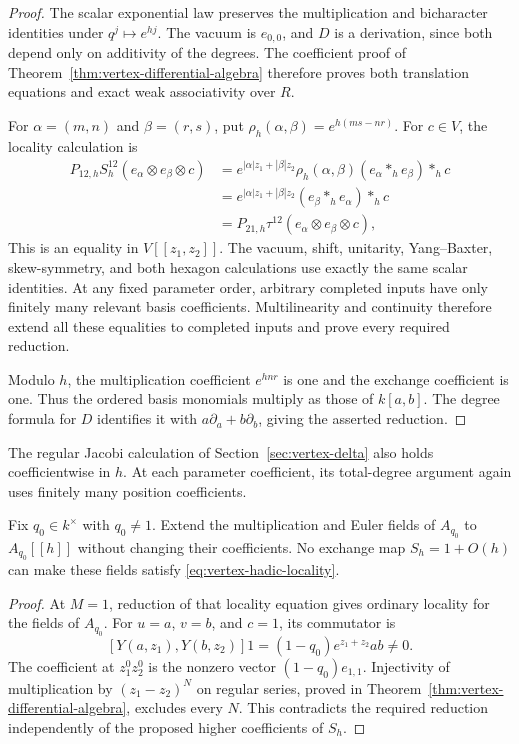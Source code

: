 \begin{proof}
The scalar exponential law preserves the multiplication and bicharacter
identities under $q^j\mapsto e^{hj}$.
The vacuum is $e_{0,0}$, and $D$ is a derivation,
since both depend only on additivity of the degrees.
The coefficient proof of
Theorem~\ref{thm:vertex-differential-algebra} therefore proves both
translation equations and exact weak associativity over $R$.

For $\alpha=(m,n)$ and $\beta=(r,s)$, put
$\rho_h(\alpha,\beta)=e^{h(ms-nr)}$.
For $c\in V$, the locality calculation is
\[
 \begin{aligned}
 P_{12,h}S_h^{12}(e_\alpha\otimes e_\beta\otimes c)
  &=e^{|\alpha|z_1+|\beta|z_2}
       \rho_h(\alpha,\beta)(e_\alpha*_h e_\beta)*_h c\\
  &=e^{|\alpha|z_1+|\beta|z_2}
       (e_\beta*_h e_\alpha)*_h c\\
  &=P_{21,h}\tau^{12}(e_\alpha\otimes e_\beta\otimes c),
 \end{aligned}
\]
This is an equality in $V[[z_1,z_2]]$.
The vacuum, shift, unitarity, Yang--Baxter, skew-symmetry, and both
hexagon calculations use exactly the same scalar identities.
At any fixed parameter order, arbitrary completed inputs have only
finitely many relevant basis coefficients.
Multilinearity and continuity therefore extend all these equalities
to completed inputs and prove every required reduction.

Modulo $h$, the multiplication coefficient $e^{hnr}$ is one and
the exchange coefficient is one.
Thus the ordered basis monomials multiply as those of $k[a,b]$.
The degree formula for $D$ identifies it with
$a\partial_a+b\partial_b$, giving the asserted reduction.
\end{proof}

The regular Jacobi calculation of Section~\ref{sec:vertex-delta}
also holds coefficientwise in $h$.
At each parameter coefficient, its total-degree argument again uses
finitely many position coefficients.

\begin{proposition}\label{prop:vertex-fixed-q-obstruction}
Fix $q_0\in k^\times$ with $q_0\ne1$.
Extend the multiplication and Euler fields of $A_{q_0}$ to
$A_{q_0}[[h]]$ without changing their coefficients.
No exchange map $S_h=1+O(h)$ can make these fields satisfy
\eqref{eq:vertex-hadic-locality}.
\end{proposition}

\begin{proof}
At $M=1$, reduction of that locality equation gives ordinary
locality for the fields of $A_{q_0}$.
For $u=a$, $v=b$, and $c=1$, its commutator is
\[
 [Y(a,z_1),Y(b,z_2)]1
   =(1-q_0)e^{z_1+z_2}ab\ne0.
\]
The coefficient at $z_1^0z_2^0$ is the nonzero vector
$(1-q_0)e_{1,1}$.
Injectivity of multiplication by $(z_1-z_2)^N$ on regular series,
proved in Theorem~\ref{thm:vertex-differential-algebra}, excludes every $N$.
This contradicts the required reduction independently of the proposed
higher coefficients of $S_h$.
\end{proof}

